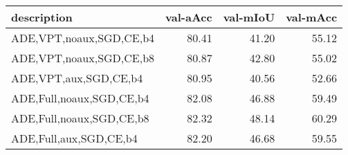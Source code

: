 \begin{tabular}{lrrr}
\toprule
description & val-aAcc & val-mIoU & val-mAcc \\
\midrule
ADE,VPT,noaux,SGD,CE,b4 & 80.41 & 41.20 & 55.12 \\
ADE,VPT,noaux,SGD,CE,b8 & 80.87 & 42.80 & 55.02 \\
ADE,VPT,aux,SGD,CE,b4 & 80.95 & 40.56 & 52.66 \\
ADE,Full,noaux,SGD,CE,b4 & 82.08 & 46.88 & 59.49 \\
ADE,Full,noaux,SGD,CE,b8 & 82.32 & 48.14 & 60.29 \\
ADE,Full,aux,SGD,CE,b4 & 82.20 & 46.68 & 59.55 \\
\bottomrule
\end{tabular}
